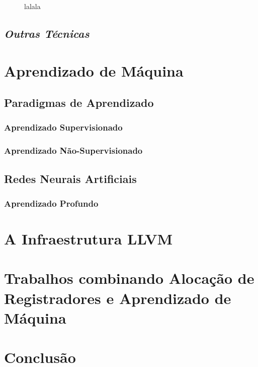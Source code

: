 \documentclass[
	12pt,				%
	openright,			%
	oneside,			%
	a4paper,			%
	tccpreliminar,			%
	]{ABNT-DC-UEL}
\begin{document}
\begin{figure}[ht]
    \centering

    \caption{lalala}
    \label{fig:splitting-2}
\end{figure}

\section{\textit{Outras Técnicas}}

\chapter{Aprendizado de Máquina}

\section{Paradigmas de Aprendizado}

\subsection{Aprendizado Supervisionado}

\subsection{Aprendizado Não-Supervisionado}

\section{Redes Neurais Artificiais}

\subsection{Aprendizado Profundo}

\chapter{A Infraestrutura LLVM}

\chapter{Trabalhos combinando Alocação de Registradores e Aprendizado de Máquina}

\chapter{Conclusão}
\end{document}

